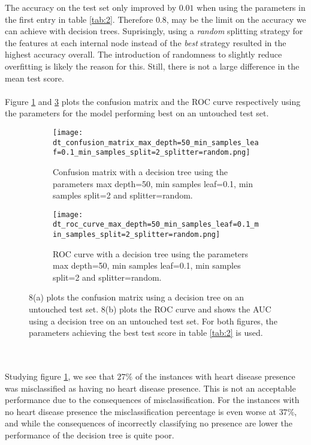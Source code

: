 \documentclass[a4paper,twocolumn]{article}
\begin{document}
The accuracy on the test set only improved by $0.01$ when using the parameters in the first entry in table \ref{tab:2}. Therefore $0.8$, may be the limit on the accuracy we can achieve with decision trees. Suprisingly, using a \textit{random} splitting strategy for the features at each internal node instead of the \textit{best} strategy resulted in the highest accuracy overall. The introduction of randomness to slightly reduce overfitting is likely the reason for this. Still, there is not a large difference in the mean test score.\\
\\
Figure \ref{fig:8a} and \ref{fig:8b} plots the confusion matrix and the ROC curve respectively using the parameters for the model performing best on an untouched test set.
\begin{figure}[ht!]
    \centering
    \begin{subfigure}[b]{\columnwidth}
        \texttt{[image: dt\_confusion\_matrix\_max\_depth=50\_min\_samples\_leaf=0.1\_min\_samples\_split=2\_splitter=random.png]}
        \caption{Confusion matrix with a decision tree using the parameters max depth=50, min samples leaf=0.1, min samples split=2 and splitter=random.}
        \label{fig:8a}
    \end{subfigure}
    
    \begin{subfigure}[b]{\columnwidth}
        \texttt{[image: dt\_roc\_curve\_max\_depth=50\_min\_samples\_leaf=0.1\_min\_samples\_split=2\_splitter=random.png]}
        \caption{ROC curve with a decision tree using the parameters max depth=50, min samples leaf=0.1, min samples split=2 and splitter=random.}
        \label{fig:8b}
    \end{subfigure}
    \caption{8(a) plots the confusion matrix using a decision tree on an untouched test set. 8(b) plots the ROC curve and shows the AUC using a decision tree on an untouched test set. For both figures, the parameters achieving the best test score in table \ref{tab:2} is used.}
\end{figure}\\
\\
Studying figure \ref{fig:8a}, we see that $27\%$ of the instances with heart disease presence was misclassified as having no heart disease presence. This is not an acceptable performance due to the consequences of misclassification. For the instances with no heart disease presence the misclassification percentage is even worse at $37\%$, and while the consequences of incorrectly classifying no presence are lower the performance of the decision tree is quite poor.\\
\end{document}
